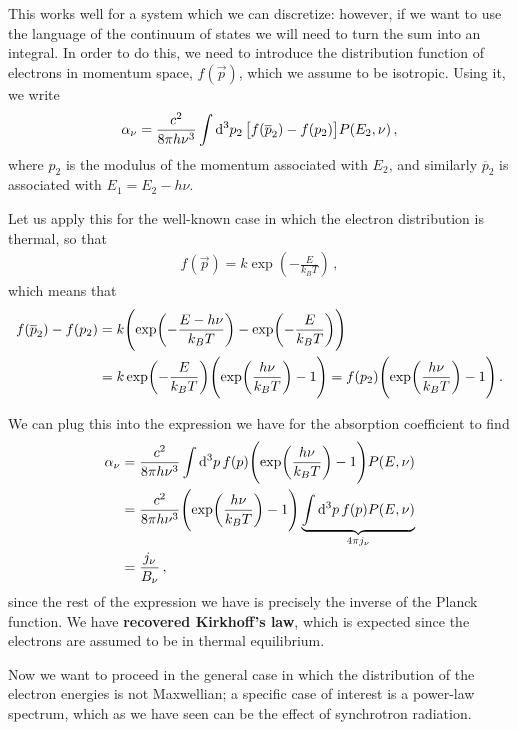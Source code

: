 \documentclass[main.tex]{subfiles}
\begin{document}
This works well for a system which we can discretize: however, if we want to use the language of the continuum of states we will need to turn the sum into an integral.
In order to do this, we need to introduce the distribution function of electrons in momentum space, \(f(\vec{p})\), which we assume to be isotropic. Using it, we write 
%
\begin{align}
\alpha _\nu = 
\frac{c^2}{8 \pi h \nu^3}
\int \dd[3]{p_2 } \qty[ f(\overline{p}_2 )- f(p_2 )]P (E_2 , \nu )
\,,
\end{align}
%
where \(p_2 \) is the modulus of the momentum associated with \(E_2 \), and similarly \(\overline{p}_2\) is associated with \(E_1 = E_2 - h \nu \). 

Let us apply this for the well-known case in which the electron distribution is thermal, so that 
%
\begin{align}
f(\vec{p}) = k \exp(- \frac{E}{k_B T})
\,,
\end{align}
%
which means that 
%
\begin{align}
f(\overline{p}_2) - f(p_2) &= k \qty(\exp(- \frac{E - h \nu }{k_B T}) - \exp(- \frac{E}{k_B T}))  \\
&= k \exp(- \frac{E}{k_B T}) \qty(\exp(\frac{h \nu }{k_B T}) - 1)
= f(p_2) \qty(\exp(\frac{h \nu }{k_B T}) - 1)
\,.
\end{align}

We can plug this into the expression we have for the absorption  coefficient  to find 
%
\begin{align}
\alpha _\nu &=
\frac{c^2}{8 \pi h \nu^3} \int \dd[3]{p} f(p) \qty(\exp(\frac{h \nu }{k_B T}) - 1) P(E, \nu )  \\
&= \frac{c^2}{8 \pi h \nu^3} \qty(\exp(\frac{h \nu }{k_B T}) - 1) \underbrace{\int \dd[3]{p} f(p) P(E, \nu ) }_{4 \pi j_\nu }  \\
&= \frac{j_\nu}{B_\nu }
\,,
\end{align}
%
since the rest of the expression we have is precisely the inverse of the Planck function. 
We have \textbf{recovered Kirkhoff's law}, which is expected since the electrons are assumed to be in thermal equilibrium. 

Now we want to proceed in the general case in which the distribution of the electron energies is not Maxwellian; a specific case of interest is a power-law spectrum, which as we have seen can be the effect of synchrotron radiation.

\end{document}
